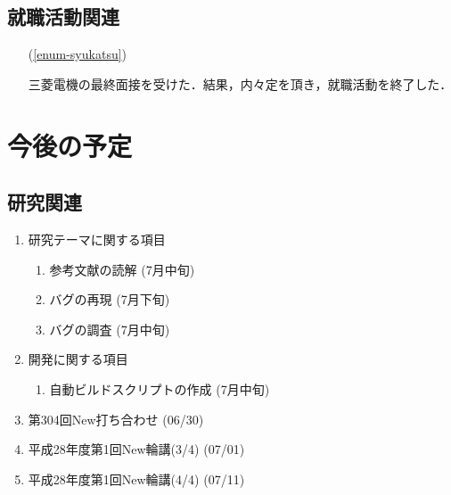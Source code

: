 \documentclass[fleqn, 12pt]{extarticle}
\begin{document}
    \setcounter{subsection}{3}
    \subsection{就職活動関連}
    \begin{itemize}

        \item[(\ref{enum-syukatsu})]
            \begin{spacing}{1.2}
                三菱電機の最終面接を受けた．結果，内々定を頂き，就職活動を終了した．
            \end{spacing}

    \end{itemize}


    \section{今後の予定}
    \label{sec-4}

    \subsection{研究関連}
    \label{sec-4-1}

    \begin{enumerate}

        \item 研究テーマに関する項目
            \hfill
            \begin{enumerate}

                \item 参考文献の読解
                    \hfill
                    (7月中旬)

                \item バグの再現
                    \hfill
                    (7月下旬)

                \item バグの調査
                    \hfill
                    (7月中旬)

            \end{enumerate}

        \item 開発に関する項目
            \hfill
            \begin{enumerate}

                \item 自動ビルドスクリプトの作成
                    \hfill
                    (7月中旬)

            \end{enumerate}

        \item 第304回New打ち合わせ
            \hfill
            \label{enum-7}
            (06/30)

        \item 平成28年度第1回New輪講(3/4)
            \hfill
            \label{enum-7}
            (07/01)

        \item 平成28年度第1回New輪講(4/4)
            \hfill
            \label{enum-7}
            (07/11)

    \end{enumerate}
\end{document}

